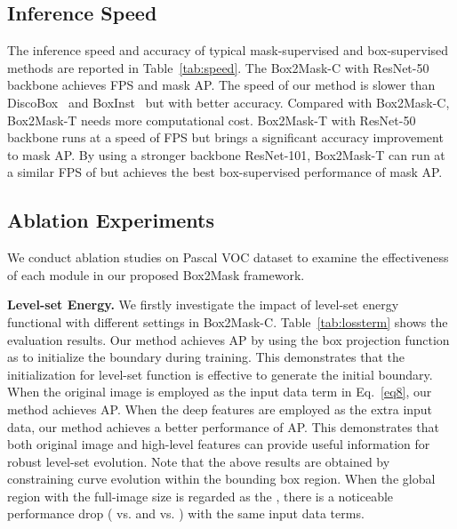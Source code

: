\documentclass[12pt,onecolumn,letterpaper]{article}
\begin{document}
\subsection{Inference Speed}
The inference speed and accuracy of typical mask-supervised and box-supervised methods are reported in Table~\ref{tab:speed}. 
The Box2Mask-C with ResNet-50 backbone achieves  FPS and  mask AP. The speed of our method is slower than DiscoBox~\cite{iccv2021discobox} and BoxInst~\cite{cvpr2021_boxinst} but with better accuracy. 
Compared with Box2Mask-C, Box2Mask-T needs more computational cost. Box2Mask-T with ResNet-50 backbone runs at a speed of  FPS but brings a significant accuracy improvement to  mask AP. 
By using a stronger backbone ResNet-101, Box2Mask-T can run at a similar FPS of  but achieves the best box-supervised performance of  mask AP.

\subsection{Ablation Experiments}
We conduct ablation studies on Pascal VOC dataset to examine the effectiveness of each module in our proposed Box2Mask framework.


\textbf{Level-set Energy.} We firstly investigate the impact of level-set energy functional with different settings in Box2Mask-C. Table~\ref{tab:lossterm} shows the evaluation results. Our method achieves  AP by using the box projection function as  to initialize the boundary during training. This demonstrates that the initialization for level-set function is effective to generate the initial boundary. When the original image  is employed as the input data term in Eq.~\ref{eq8}, our method achieves  AP. When the deep features  are employed as the extra input data, our method achieves a better performance of  AP. This demonstrates that both original image and high-level features can provide useful information for robust level-set evolution. Note that the above results are obtained by constraining curve evolution within the bounding box  region. When the global region with the full-image size is regarded as the , there is a noticeable performance drop ( vs.  and  vs. ) with the same input data terms. 
\end{document}
